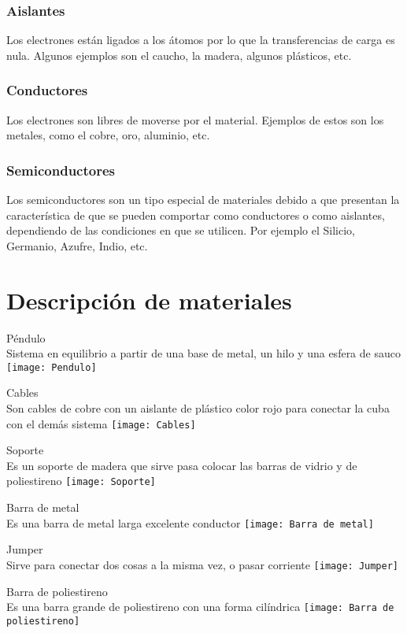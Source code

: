 \documentclass[14pt]{article}
\begin{document}
	\subsubsection{Aislantes}
	Los electrones están ligados a los átomos por lo que la transferencias de carga es nula. Algunos ejemplos son el caucho, la madera, algunos plásticos, etc. 
	\subsubsection{Conductores}
	Los electrones son libres de moverse por el material. Ejemplos de estos son los metales, como el cobre, oro, aluminio, etc.
	\subsubsection{Semiconductores}
	Los semiconductores son un tipo especial de materiales debido a que
	presentan la característica de que se pueden comportar como conductores
	o como aislantes, dependiendo de las condiciones en que se utilicen. Por ejemplo el Silicio, Germanio, Azufre, Indio, etc. 

	\section{Descripción de materiales}
Péndulo\\
Sistema en equilibrio a partir de una base de metal, un hilo y una esfera de sauco
\texttt{[image: Pendulo]}

Cables\\ 
Son cables de cobre con un aislante de plástico color rojo para conectar la cuba con el demás sistema 
\texttt{[image: Cables]}

Soporte \\
Es un soporte de madera que sirve pasa colocar las barras de vidrio y de poliestireno 
\texttt{[image: Soporte]}

Barra de metal \\
Es una barra de metal larga excelente conductor 
\texttt{[image: Barra de metal]}

Jumper \\
Sirve para conectar dos cosas a la misma vez, o pasar corriente 
\texttt{[image: Jumper]}

Barra de poliestireno \\
Es una barra grande de poliestireno con una forma cilíndrica 
\texttt{[image: Barra de poliestireno]}
\end{document}
